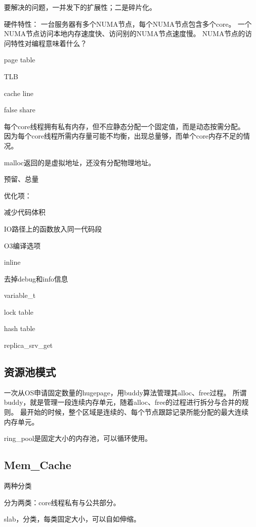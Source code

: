 要解决的问题，一并发下的扩展性；二是碎片化。

硬件特性： 一台服务器有多个NUMA节点，每个NUMA节点包含多个core。
一个NUMA节点访问本地内存速度快、访问别的NUMA节点速度慢。
NUMA节点的访问特性对编程意味着什么？

\begin{enumbox}
\item page table
\item TLB
\item cache line
\item false share
\end{enumbox}

每个core线程拥有私有内存，但不应静态分配一个固定值，而是动态按需分配。
因为每个core线程所需内存量可能不均衡，出现总量够，而单个core内存不足的情况。

malloc返回的是虚拟地址，还没有分配物理地址。

预留、总量

优化项：
\begin{enumbox}
\item 减少代码体积
\item IO路径上的函数放入同一代码段
\item O3编译选项
\item inline
\item 去掉debug和info信息
\item variable\_t
\item lock table
\item hash table
\item replica\_srv\_get
\end{enumbox}

\subsection{资源池模式}

一次从OS申请固定数量的hugepage，用buddy算法管理其alloc、free过程。
所谓buddy，就是管理一段连续内存单元，随着alloc、free的过程进行拆分与合并的规则。
最开始的时候，整个区域是连续的、每个节点跟踪记录所能分配的最大连续内存单元。

ring\_pool是固定大小的内存池，可以循环使用。

\subsection{Mem\_Cache}

两种分类
\begin{enumbox}
\item 分为两类：core线程私有与公共部分。
\item slab，分类，每类固定大小，可以自如伸缩。
\end{enumbox}

